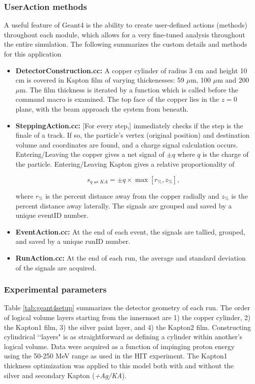 \documentclass{mc2015}
\begin{document}
\subsubsection{UserAction methods}

A useful feature of Geant4 is the ability to create user-defined actions (methods) throughout each module, which allows for a very fine-tuned analysis throughout the entire simulation.  The following summarizes the custom details and methods for this application

\begin{itemize}
\item \textbf{DetectorConstruction.cc:} A copper cylinder of radius 3 cm and height 10 cm is covered in Kapton film of varying thickenesses: 59 $\mu$m, 100 $\mu$m and 200 $\mu$m.  The film thickness is iterated by a function which is called before the command macro is examined.  The top face of the copper lies in the $z=0$ plane, with the beam approach the system from beneath.
\item \textbf{SteppingAction.cc:} [For every step,] immediately checks if the step is the finale of a track.  If so, the particle's vertex (original position) and destination volume and coordinates are found, and a charge signal calculation occurs.  Entering/Leaving the copper gives a net signal of $\pm q$ where $q$ is the charge of the particle.  Entering/Leaving Kapton gives a relative proportionality of

\begin{equation}
s_{q\rightleftharpoons KA} = \pm q\times\max\left[r_{\%}, z_{\%}\right], \label{eqn:s_KA}
\end{equation}

where $r_{\%}$ is the percent distance away from the copper radially and $z_{\%}$ is the percent distance away laterally.  The signals are grouped and saved by a unique eventID number.
\item \textbf{EventAction.cc:} At the end of each event, the signals are tallied, grouped, and saved by a unique runID number.
\item \textbf{RunAction.cc:} At the end of each run, the average and standard deviation of the signals are acquired.
\end{itemize}

\subsubsection{Experimental parameters}

Table \ref{tab:geant4setup} summarizes the detector geometry of each run.  The order of logical volume layers starting from the innermost are 1) the copper cylinder, 2) the Kapton1 film, 3) the silver paint layer, and 4) the Kapton2 film.  Constructing cylindrical \lq\lq layers" is as straightforward as defining a cylinder within another's logical volume.  Data were acquired as a function of impinging proton energy using the 50-250 MeV range as used in the HIT experiment.  The Kapton1 thickness optimization was applied to this model both with and without the silver and secondary Kapton (\emph{+Ag/KA}).
\end{document}
